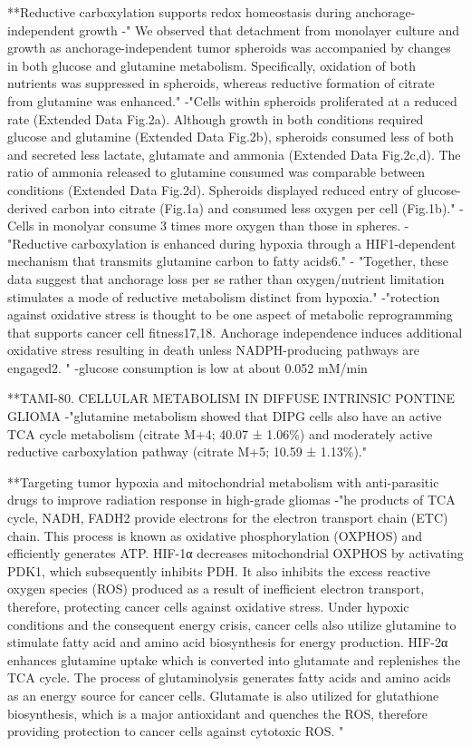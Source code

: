 \documentclass[11pt,a4paper]{article}
\begin{document}
**Reductive carboxylation supports redox homeostasis during anchorage-independent growth
-" We observed that detachment from monolayer culture and growth as anchorage-independent tumor spheroids was accompanied by changes in both glucose and glutamine metabolism. Specifically, oxidation of both nutrients was suppressed in spheroids, whereas reductive formation of citrate from glutamine was enhanced."
-"Cells within spheroids proliferated at a reduced rate (Extended Data Fig.2a). Although growth in both conditions required glucose and glutamine (Extended Data Fig.2b), spheroids consumed less of both and secreted less lactate, glutamate and ammonia (Extended Data Fig.2c,d). The ratio of ammonia released to glutamine consumed was comparable between conditions (Extended Data Fig.2d). Spheroids displayed reduced entry of glucose-derived carbon into citrate (Fig.1a) and consumed less oxygen per cell (Fig.1b)."
- Cells in monolyar consume 3 times more oxygen than those in spheres.
- "Reductive carboxylation is enhanced during hypoxia through a HIF1-dependent mechanism that transmits glutamine carbon to fatty acids6." 
- "Together, these data suggest that anchorage loss per se rather than oxygen/nutrient limitation stimulates a mode of reductive metabolism distinct from hypoxia."
-"rotection against oxidative stress is thought to be one aspect of metabolic reprogramming that supports cancer cell fitness17,18. Anchorage independence induces additional oxidative stress resulting in death unless NADPH-producing pathways are engaged2. "
-glucose consumption is low at about 0.052 mM/min


**TAMI-80. CELLULAR METABOLISM IN DIFFUSE INTRINSIC PONTINE GLIOMA
-"glutamine metabolism showed that DIPG cells also have an active TCA cycle metabolism (citrate M+4; 40.07 ± 1.06\%) and moderately active reductive carboxylation pathway (citrate M+5; 10.59 ± 1.13\%)."

**Targeting tumor hypoxia and mitochondrial metabolism with anti-parasitic drugs to improve radiation response in high-grade gliomas
-"he products of TCA cycle, NADH, FADH2 provide electrons for the electron transport chain (ETC) chain. This process is known as oxidative phosphorylation (OXPHOS) and efficiently generates ATP. HIF-1α decreases mitochondrial OXPHOS by activating PDK1, which subsequently inhibits PDH. It also inhibits the excess reactive oxygen species (ROS) produced as a result of inefficient electron transport, therefore, protecting cancer cells against oxidative stress. Under hypoxic conditions and the consequent energy crisis, cancer cells also utilize glutamine to stimulate fatty acid and amino acid biosynthesis for energy production. HIF-2α enhances glutamine uptake which is converted into glutamate and replenishes the TCA cycle. The process of glutaminolysis generates fatty acids and amino acids as an energy source for cancer cells. Glutamate is also utilized for glutathione biosynthesis, which is a major antioxidant and quenches the ROS, therefore providing protection to cancer cells against cytotoxic ROS. "
\end{document}
